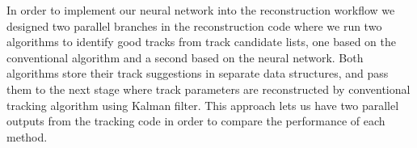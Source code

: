 In order to implement our neural network into the reconstruction workflow we designed two parallel branches in the reconstruction code where we run 
two algorithms to identify good tracks from track candidate lists, one based on the conventional algorithm and a second based on the neural network.
Both algorithms store their track suggestions in separate data structures, and pass them to the next stage where track parameters are reconstructed by 
conventional tracking algorithm using Kalman filter. This approach lets us have two parallel outputs from the tracking code in order to compare the performance of
each method.

